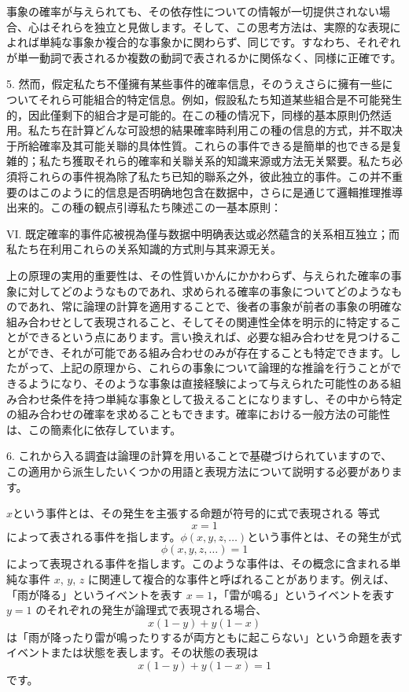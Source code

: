 \documentclass[a4paper,11pt,openany]{ltjsbook}
\begin{document}
事象の確率が与えられても、その依存性についての情報が一切提供されない場合、心はそれらを独立と見做します。そして、この思考方法は、実際的な表現によれば単純な事象か複合的な事象かに関わらず、同じです。すなわち、それぞれが単一動詞で表されるか複数の動詞で表されるかに関係なく、同様に正確です。

5. 然而，假定私たち不僅擁有某些事件的確率信息，そのうえさらに擁有一些についてそれら可能組合的特定信息。例如，假設私たち知道某些組合是不可能発生的，因此僅剩下的組合才是可能的。在この種の情况下，同様的基本原則仍然适用。私たち在計算どんな可設想的結果確率時利用この種の信息的方式，并不取决于所給確率及其可能关聯的具体性質。これらの事件できる是簡単的也できる是复雑的；私たち獲取それら的確率和关聯关系的知識来源或方法无关緊要。私たち必須将これらの事件視為除了私たち已知的聯系之外，彼此独立的事件。この并不重要のはこのように的信息是否明确地包含在数据中，さらに是通じて邏輯推理推導出来的。この種の観点引導私たち陳述この一基本原則：

VI. 既定確率的事件応被視為僅与数据中明确表达或必然蘊含的关系相互独立；而私たち在利用これらの关系知識的方式則与其来源无关。

上の原理の実用的重要性は、その性質いかんにかかわらず、与えられた確率の事象に対してどのようなものであれ、求められる確率の事象についてどのようなものであれ、常に論理の計算を適用することで、後者の事象が前者の事象の明確な組み合わせとして表現されること、そしてその関連性全体を明示的に特定することができるという点にあります。言い換えれば、必要な組み合わせを見つけることができ、それが可能である組み合わせのみが存在することも特定できます。したがって、上記の原理から、これらの事象について論理的な推論を行うことができるようになり、そのような事象は直接経験によって与えられた可能性のある組み合わせ条件を持つ単純な事象として扱えることになりますし、その中から特定の組み合わせの確率を求めることもできます。確率における一般方法の可能性は、この簡素化に依存しています。

6. これから入る調査は論理の計算を用いることで基礎づけられていますので、この適用から派生したいくつかの用語と表現方法について説明する必要があります。

$x$という事件とは、その発生を主張する命題が符号的に式で表現される
等式
\[
x = 1
\]
によって表される事件を指します。$\phi(x, y, z, \dotsc)$という事件とは、その発生が式
\[
\phi(x, y, z, \dotsc) = 1
\]
によって表現される事件を指します。このような事件は、その概念に含まれる単純な事件 $x$, $y$, $z$ に関連して複合的な事件と呼ばれることがあります。例えば、「雨が降る」というイベントを表す $x = 1$，「雷が鳴る」というイベントを表す $y = 1$ のそれぞれの発生が論理式で表現される場合、
\[
x(1 - y) + y (1 - x)
\]
は「雨が降ったり雷が鳴ったりするが両方ともに起こらない」という命題を表すイベントまたは状態を表します。その状態の表現は
\[
x(1 - y) + y(1 - x) = 1
\]
です。
\end{document}
